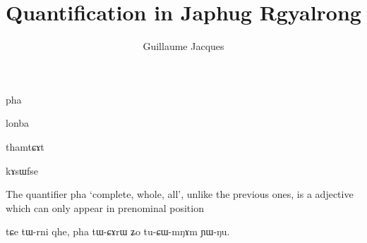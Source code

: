 \documentclass[oldfontcommands,oneside,a4paper,11pt]{article}
\newcommand{\ipa}[1]{{\phon #1}} %
\begin{document}
 

\title{Quantification in Japhug Rgyalrong}
\author{Guillaume Jacques}
\maketitle
\linenumbers
 
 \ipa{pha}
 
 \ipa{lonba}
 
 \ipa{thamtɕɤt}
 
 \ipa{kɤsɯfse}
 
 
The quantifier \ipa{pha} `complete, whole, all', unlike the previous ones, is a   adjective  which can only appear in prenominal position 

tɕe tɯ-rni qhe, pha tɯ-ɕɤrɯ ʑo tu-ɕɯ-mŋɤm ɲɯ-ŋu.




\end{document}
